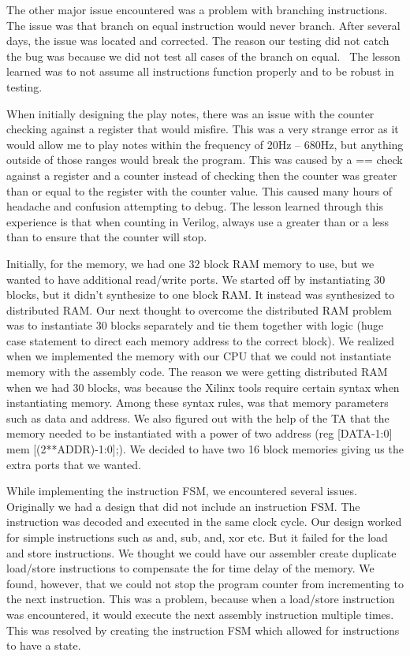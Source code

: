 \documentclass[letterpaper, 11 pt, conference]{article}
\begin{document}
The other major issue encountered was a problem with branching instructions. The issue was that branch on equal instruction would never branch. After several days, the issue was located and corrected. The reason our testing did not catch the bug was because we did not test all cases of the branch on equal.  The lesson learned was to not assume all instructions function properly and to be robust in testing.

When initially designing the play notes, there was an issue with the counter checking against a register that would misfire. This was a very strange error as it would allow me to play notes within the frequency of 20Hz – 680Hz, but anything outside of those ranges would break the program. This was caused by a == check against a register and a counter instead of checking then the counter was greater than or equal to the register with the counter value. This caused many hours of headache and confusion attempting to debug. The lesson learned through this experience is that when counting in Verilog, always use a greater than or a less than to ensure that the counter will stop.

Initially, for the memory, we had one 32 block RAM memory to use, but we wanted to have additional read/write ports. We started off by instantiating 30 blocks, but it didn’t synthesize to one block RAM. It instead was synthesized to distributed RAM. Our next thought to overcome the distributed RAM problem was to instantiate 30 blocks separately and tie them together with logic (huge case statement to direct each memory address to the correct block). We realized when we implemented the memory with our CPU that we could not instantiate memory with the assembly code. The reason we were getting distributed RAM when we had 30 blocks, was because the Xilinx tools require certain syntax when instantiating memory. Among these syntax rules, was that memory parameters such as data and address.  We also figured out with the help of the TA that the memory needed to be instantiated with a power of two address (reg [DATA-1:0] mem [(2**ADDR)-1:0];). We decided to have two 16 block memories giving us the extra ports that we wanted.

While implementing the instruction FSM, we encountered several issues. Originally we had a design that did not include an instruction FSM. The instruction was decoded and executed in the same clock cycle. Our design worked for simple instructions such as and, sub, and, xor etc. But it failed for the load and store instructions. We thought we could have our assembler create duplicate load/store instructions to compensate the for time delay of the memory. We found, however, that we could not stop the program counter from incrementing to the next instruction. This was a problem, because when a load/store instruction was encountered, it would execute the next assembly instruction multiple times. This was resolved by creating the instruction FSM which allowed for instructions to have a state.
\end{document}
